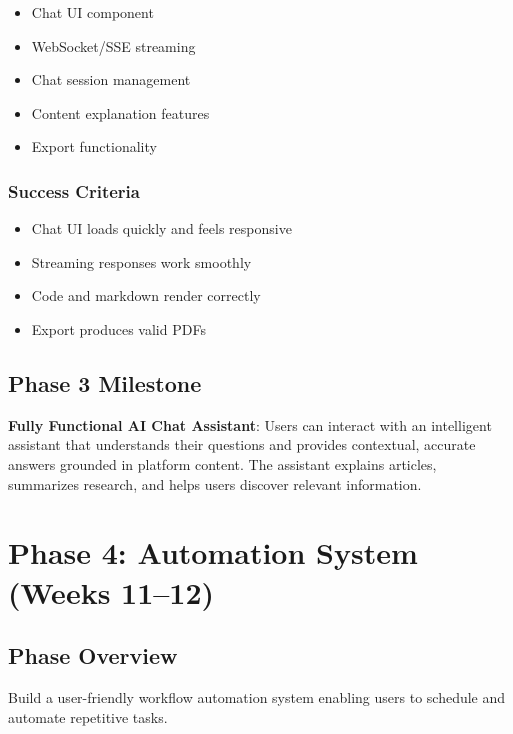 \documentclass[12pt,oneside]{report}
\begin{document}
\begin{itemize}
    \item Chat UI component
    \item WebSocket/SSE streaming
    \item Chat session management
    \item Content explanation features
    \item Export functionality
\end{itemize}

\subsubsection{Success Criteria}

\begin{itemize}
    \item Chat UI loads quickly and feels responsive
    \item Streaming responses work smoothly
    \item Code and markdown render correctly
    \item Export produces valid PDFs
\end{itemize}

\subsection{Phase 3 Milestone}

\textbf{Fully Functional AI Chat Assistant}: Users can interact with an intelligent assistant that understands their questions and provides contextual, accurate answers grounded in platform content. The assistant explains articles, summarizes research, and helps users discover relevant information.

\section{Phase 4: Automation System (Weeks 11--12)}

\subsection{Phase Overview}

Build a user-friendly workflow automation system enabling users to schedule and automate repetitive tasks.
\end{document}
